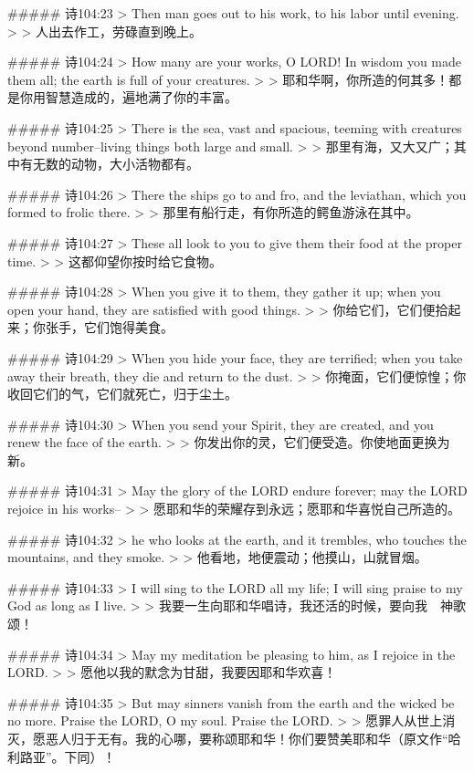 ##### 诗104:23
> Then man goes out to his work, to his labor until evening.
>
> 人出去作工，劳碌直到晚上。


##### 诗104:24
> How many are your works, O LORD! In wisdom you made them all; the earth is full of your creatures.
>
> 耶和华啊，你所造的何其多！都是你用智慧造成的，遍地满了你的丰富。


##### 诗104:25
> There is the sea, vast and spacious, teeming with creatures beyond number--living things both large and small.
>
> 那里有海，又大又广；其中有无数的动物，大小活物都有。


##### 诗104:26
> There the ships go to and fro, and the leviathan, which you formed to frolic there.
>
> 那里有船行走，有你所造的鳄鱼游泳在其中。


##### 诗104:27
> These all look to you to give them their food at the proper time.
>
> 这都仰望你按时给它食物。


##### 诗104:28
> When you give it to them, they gather it up; when you open your hand, they are satisfied with good things.
>
> 你给它们，它们便拾起来；你张手，它们饱得美食。


##### 诗104:29
> When you hide your face, they are terrified; when you take away their breath, they die and return to the dust.
>
> 你掩面，它们便惊惶；你收回它们的气，它们就死亡，归于尘土。


##### 诗104:30
> When you send your Spirit, they are created, and you renew the face of the earth.
>
> 你发出你的灵，它们便受造。你使地面更换为新。


##### 诗104:31
> May the glory of the LORD endure forever; may the LORD rejoice in his works--
>
> 愿耶和华的荣耀存到永远；愿耶和华喜悦自己所造的。


##### 诗104:32
> he who looks at the earth, and it trembles, who touches the mountains, and they smoke.
>
> 他看地，地便震动；他摸山，山就冒烟。


##### 诗104:33
> I will sing to the LORD all my life; I will sing praise to my God as long as I live.
>
> 我要一生向耶和华唱诗，我还活的时候，要向我　神歌颂！


##### 诗104:34
> May my meditation be pleasing to him, as I rejoice in the LORD.
>
> 愿他以我的默念为甘甜，我要因耶和华欢喜！


##### 诗104:35
> But may sinners vanish from the earth and the wicked be no more. Praise the LORD, O my soul. Praise the LORD.
>
> 愿罪人从世上消灭，愿恶人归于无有。我的心哪，要称颂耶和华！你们要赞美耶和华（原文作“哈利路亚”。下同）！


